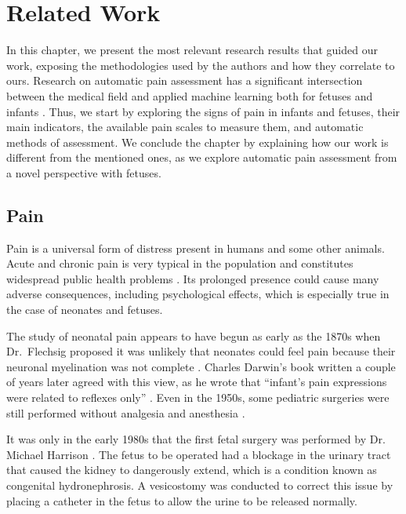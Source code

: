 \chapter{Related Work}

In this chapter, we present the most relevant research results that guided our work, exposing the methodologies used by the authors and how they correlate to ours. Research on automatic pain assessment has a significant intersection between the medical field and applied machine learning both for fetuses and infants \citep{Bellieni2012, ZamzmiPGKSA16}. Thus, we start by exploring the signs of pain in infants and fetuses, their main indicators, the available pain scales to measure them, and automatic methods of assessment. We conclude the chapter by explaining how our work is different from the mentioned ones, as we explore automatic pain assessment from a novel perspective with fetuses.

\section{Pain}

Pain is a universal form of distress present in humans and some other animals. Acute and chronic pain is very typical in the population and constitutes widespread public health problems \citep{Goldberg2011}. Its prolonged presence could cause many adverse consequences, including psychological effects, which is especially true in the case of neonates and fetuses.

The study of neonatal pain appears to have begun as early as the 1870s when Dr.\ Flechsig proposed it was unlikely that neonates could feel pain because their neuronal myelination was not complete \citep{cope1998neonatal}. Charles Darwin's book written a couple of years later agreed with this view, as he wrote that ``infant's pain expressions were related to reflexes only'' \citep{darwin1872expression}. Even in the 1950s, some pediatric surgeries were still performed without analgesia and anesthesia \citep{cope1998neonatal}.

It was only in the early 1980s that the first fetal surgery was performed by Dr. Michael Harrison \citep{Harrison1982}. The fetus to be operated had a blockage in the urinary tract that caused the kidney to dangerously extend, which is a condition known as congenital hydronephrosis. A vesicostomy was conducted to correct this issue by placing a catheter in the fetus to allow the urine to be released normally.

